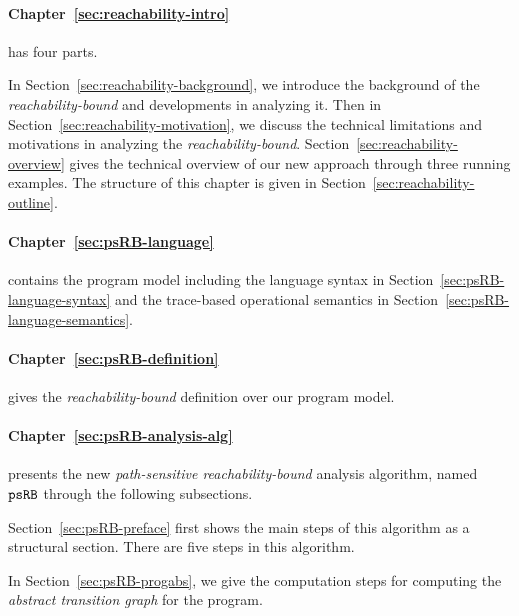 \begin{enumerate}
 \paragraph{Chapter~\ref{sec:reachability-intro}} has four parts.

 In Section~\ref{sec:reachability-background}, we introduce the background of the
 \emph{reachability-bound} and developments in analyzing it.
 Then in
 Section~\ref{sec:reachability-motivation}, we discuss
 the technical limitations and motivations in analyzing the \emph{reachability-bound}.
 Section~\ref{sec:reachability-overview} gives the technical overview of our new approach through
 three running examples.
 The structure of this chapter is given 
 in Section~\ref{sec:reachability-outline}.

 \paragraph{Chapter~\ref{sec:psRB-language}} contains the program model including the
 language syntax in Section~\ref{sec:psRB-language-syntax} and the trace-based operational semantics in Section~\ref{sec:psRB-language-semantics}.
 
\paragraph{Chapter~\ref{sec:psRB-definition}} gives the \emph{reachability-bound} definition over our program model.

\paragraph{Chapter~\ref{sec:psRB-analysis-alg}} 
presents the new \emph{path-sensitive reachability-bound} analysis algorithm, named $\mathtt{psRB}$ through the following subsections.
 
 Section~\ref{sec:psRB-preface} first shows the main steps of this algorithm as a structural section. There are five steps in this algorithm.
 
 In Section~\ref{sec:psRB-progabs}, we give the computation steps for computing the \emph{abstract transition graph}
 for the program.


\end{enumerate}
